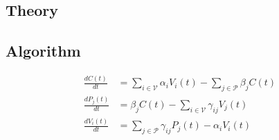 \documentclass{article}
\begin{document}
\subsection{Theory}


\subsection{Algorithm}


\begin{align}\label{eqn:diffeq}
\frac{dC(t)}{dt}  &= \sum_{i \in \mathcal{V}}\alpha_i V_i(t) - \sum_{j \in \mathcal{P}}\beta_j C(t)\\
\frac{dP_j(t)}{dt}  &= \beta_j C(t) - \sum_{i \in \mathcal{V}}\gamma_{ij}V_j(t) \\
\frac{dV_i(t)}{dt}  &= \sum_{j \in \mathcal{P}}\gamma_{ij}P_j(t) - \alpha_i V_i(t)
\end{align}
\end{document}
